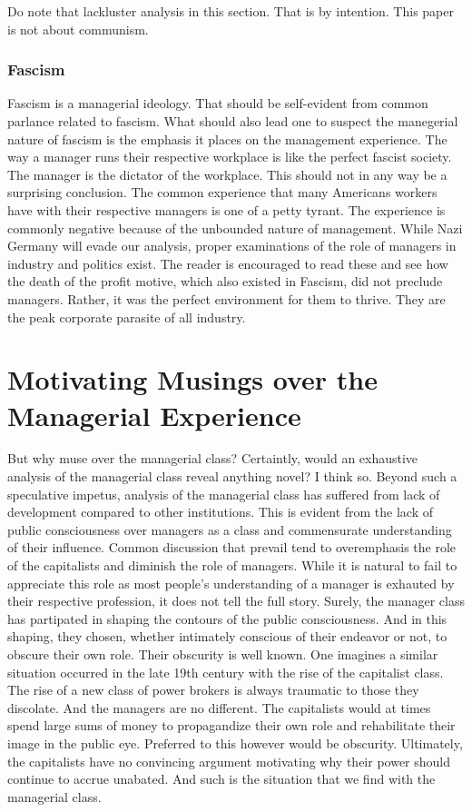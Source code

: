 \documentclass[12pt]{article}
\begin{document}
Do note that lackluster analysis in this section.
That is by intention.
This paper is not about communism.

\subsubsection{Fascism}
Fascism is a managerial ideology.
That should be self-evident from common parlance related to fascism.
What should also lead one to suspect the manegerial nature of fascism is the emphasis it places on the management experience.
The way a manager runs their respective workplace is like the perfect fascist society.
The manager is the dictator of the workplace.
This should not in any way be a surprising conclusion.
The common experience that many Americans workers have with their respective managers is one of a petty tyrant.
The experience is commonly negative because of the unbounded nature of management.
While Nazi Germany will evade our analysis, proper examinations of the role of managers in industry and politics exist.
The reader is encouraged to read these and see how the death of the profit motive, which also existed in Fascism, did not preclude managers.
Rather, it was the perfect environment for them to thrive.
They are the peak corporate parasite of all industry.


\section{Motivating Musings over the Managerial Experience}
But why muse over the managerial class?
Certaintly, would an exhaustive analysis of the managerial class reveal anything novel?
I think so.
Beyond such a speculative impetus, analysis of the managerial class has suffered from lack of development compared to other institutions.
This is evident from the lack of public consciousness over managers as a class and commensurate understanding of their influence.
Common discussion that prevail tend to overemphasis the role of the capitalists and diminish the role of managers.
While it is natural to fail to appreciate this role as most people's understanding of a manager is exhauted by their respective profession, it does not tell the full story.
Surely, the manager class has partipated in shaping the contours of the public consciousness.
And in this shaping, they chosen, whether intimately conscious of their endeavor or not, to obscure their own role.
Their obscurity is well known.
One imagines a similar situation occurred in the late 19th century with the rise of the capitalist class.
The rise of a new class of power brokers is always traumatic to those they discolate.
And the managers are no different.
The capitalists would at times spend large sums of money to propagandize their own role and rehabilitate their image in the public eye.
Preferred to this however would be obscurity.
Ultimately, the capitalists have no convincing argument motivating why their power should continue to accrue unabated.
And such is the situation that we find with the managerial class.
\end{document}
